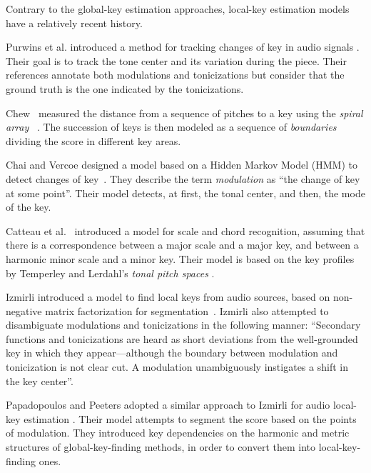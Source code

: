 Contrary to the global-key estimation approaches, local-key estimation models have a relatively recent history.

Purwins et al. introduced a method for tracking changes of key in audio signals %
\cite{purwins_new_2000}. 
Their goal is to track the tone center and its variation during the piece. Their references annotate both modulations and tonicizations but consider that the ground truth is the one indicated by the tonicizations.

Chew~\cite{chew2002key} measured the distance from a sequence of pitches to a key using the \emph{spiral array} ~\cite{Chew2000TowardsAM}. 
The succession of keys is then modeled as a sequence of \emph{boundaries} dividing the score in different key areas.

Chai and Vercoe designed a model based on a Hidden Markov Model (HMM) to detect changes of key~\cite{chai_detection_2005}. 
They describe the term \emph{modulation} as ``the change of key at some point''. 
Their model detects, at first, the tonal center, and then, the mode of the key.

Catteau et al.~\cite{Catteau07tonalkey} introduced a model for scale and chord recognition, assuming that there is a correspondence between a major scale and a major key, and between a harmonic minor scale and a minor key. Their model is based on the key profiles by Temperley \cite{Temperley99:tonality} and Lerdahl's \emph{tonal pitch spaces} \cite{lerdahl88tps}.

Izmirli introduced a model to find local keys from audio sources, based on non-negative matrix factorization for segmentation~\cite{izmirli_localized_2007}. 
Izmirli also attempted to disambiguate modulations and tonicizations in the following manner: ``Secondary functions and tonicizations are heard as short deviations from the well-grounded key in which they appear---although the boundary between modulation and tonicization is not clear cut. A modulation unambiguously instigates a shift in the key center''. 

Papadopoulos and Peeters adopted a similar approach to Izmirli for audio local-key estimation \cite{papadopoulos_local_2009}.
Their model attempts to segment the score based on the points of modulation. 
They introduced key dependencies on the harmonic and metric structures of global-key-finding methods, in order to convert them into local-key-finding ones. 

